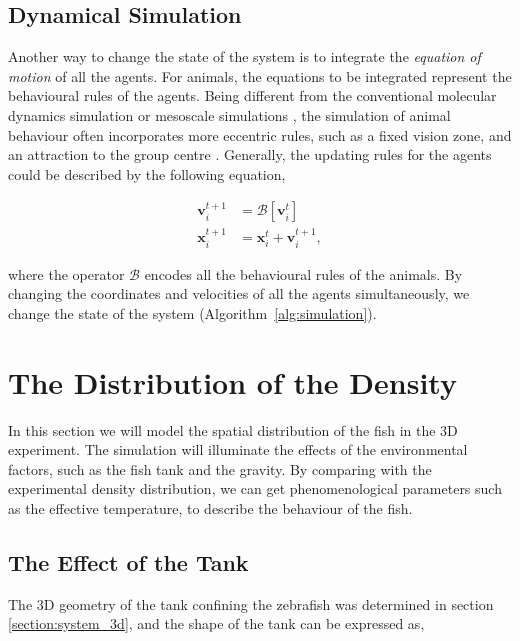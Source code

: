\documentclass[11pt,twoside]{report}
\begin{document}
\subsection{Dynamical Simulation}


Another way to change the state of the system is to integrate the \emph{equation of motion} of all the agents. For animals, the equations to be integrated represent the behavioural rules of the agents.
Being different from the conventional molecular dynamics simulation or mesoscale simulations \cite{allen2017}, the simulation of animal behaviour often incorporates more eccentric rules, such as a fixed vision zone\cite{couzin2002, yigit2020}, and an attraction to the group centre \cite{reynolds1987}. Generally, the updating rules for the agents could be described by the following equation,

\begin{equation*}
\begin{split}
	\mathbf{v}_{i}^{t+1}
	&= \mathcal{B} [\mathbf{v}_{i}^t] \\
	\mathbf{x}_i^{t+1}
	&= \mathbf{x}_i^{t} + \mathbf{v}_i^{t+1},
\end{split}
\end{equation*}

\noindent where the operator $\mathcal{B}$ encodes all the behavioural rules of the animals. By changing the coordinates and velocities of all the agents simultaneously, we change the state of the system (Algorithm~\ref{alg:simulation}).


\section{The Distribution of the Density}
\label{section:simulate-density}

In this section we will model the spatial distribution of the fish in the 3D experiment. The simulation will illuminate the effects of the environmental factors, such as the fish tank and the gravity. By comparing with the experimental density distribution, we can get phenomenological parameters such as the effective temperature, to describe the behaviour of the fish.



\subsection{The Effect of the Tank}
\label{section:sim-mc-tank}

The 3D geometry of the tank confining the zebrafish was determined in section \ref{section:system_3d}, and the shape of the tank can be expressed as,
\end{document}
